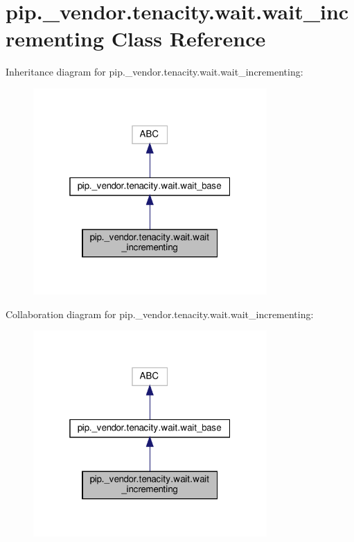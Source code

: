 \hypertarget{classpip_1_1__vendor_1_1tenacity_1_1wait_1_1wait__incrementing}{}\section{pip.\+\_\+vendor.\+tenacity.\+wait.\+wait\+\_\+incrementing Class Reference}
\label{classpip_1_1__vendor_1_1tenacity_1_1wait_1_1wait__incrementing}


Inheritance diagram for pip.\+\_\+vendor.\+tenacity.\+wait.\+wait\+\_\+incrementing\+:
\nopagebreak
\begin{figure}[H]
\begin{center}
\leavevmode
\includegraphics[width=253pt]{classpip_1_1__vendor_1_1tenacity_1_1wait_1_1wait__incrementing__inherit__graph}
\end{center}
\end{figure}


Collaboration diagram for pip.\+\_\+vendor.\+tenacity.\+wait.\+wait\+\_\+incrementing\+:
\nopagebreak
\begin{figure}[H]
\begin{center}
\leavevmode
\includegraphics[width=253pt]{classpip_1_1__vendor_1_1tenacity_1_1wait_1_1wait__incrementing__coll__graph}
\end{center}
\end{figure}
